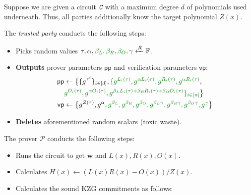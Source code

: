 \documentclass[../lecture-notes.tex]{subfiles}
\begin{document}
\begin{tcolorbox}[title=Attempt \#3: Sound SNARK Protocol,
    colback=blue!5!white,
    colframe=blue!75!black,
    colbacktitle=blue!25!white,
    coltitle=blue!20!black,
    fonttitle=\bfseries,
    boxrule=1.25pt,
    subtitle style={boxrule=0pt,
    colback=blue!20!white,
    colupper=blue!75!gray} ]

    Suppose we are given a circuit $\textit{\texttt{C}}$ with a maximum degree $d$ of polynomials used underneath. Thus, all parties additionally know the target polynomial $Z(x)$.

    The \emph{trusted party} conducts the following steps:
    \begin{itemize}[label=]
        \item Picks random values $\tau, \alpha, \textcolor{green!50!black}{\beta_L, \beta_R, \beta_O, \gamma} \xleftarrow{R} \mathbb{F}$.
        \item \textbf{Outputs} prover parameters $\mathsf{pp}$ and verification parameters $\mathsf{vp}$:
        \begin{align*}
            \mathsf{pp} &\gets \big\{\{g^{\tau^i}\}_{i \in [d]}, \textcolor{green!50!black}{\{g^{L_i(\tau)}, g^{\alpha L_i(\tau)}, g^{R_i(\tau)}, g^{\alpha R_i(\tau)}}, \\ 
            & \textcolor{green!50!black}{g^{O_i(\tau)}, g^{\alpha O_i(\tau)}, g^{\beta_LL_i(\tau)+\beta_RR_i(\tau)+\beta_OO_i(\tau)}\}_{i \in [n]}}\big\} \\
            \mathsf{vp} &\gets \big\{ g^{Z(\tau)}, g^{\alpha}, \textcolor{green!50!black}{g^{\beta_L}, g^{\beta_R}, g^{\beta_O}, g^{\beta_L\gamma}, g^{\beta_R\gamma}, g^{\beta_O\gamma}, g^{\gamma}} \big\}
        \end{align*}
        \item \textbf{Deletes} aforementioned random scalars (toxic waste).
    \end{itemize}
    The prover $\mathcal{P}$ conducts the following steps:
    \begin{itemize}[label=]
        \item Runs the circuit to get $\mathbf{w}$ and $L(x),R(x),O(x)$.
        \item Calculates $H(x) \gets (L(x)R(x) - O(x))\big/ Z(x)$.
        \item Calculates the sound KZG commitments as follows: 
        \begin{align*}

\end{align*}
\end{itemize}
\end{tcolorbox}
\end{document}
